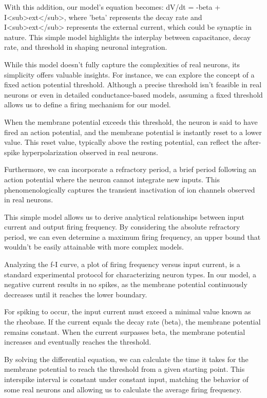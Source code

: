 With this addition, our model's equation becomes: dV/dt = -beta + I<sub>ext</sub>, where 'beta' represents the decay rate and I<sub>ext</sub> represents the external current, which could be synaptic in nature. This simple model highlights the interplay between capacitance, decay rate, and threshold in shaping neuronal integration.

While this model doesn't fully capture the complexities of real neurons, its simplicity offers valuable insights. For instance, we can explore the concept of a fixed action potential threshold. Although a precise threshold isn't feasible in real neurons or even in detailed conductance-based models, assuming a fixed threshold allows us to define a firing mechanism for our model.

When the membrane potential exceeds this threshold, the neuron is said to have fired an action potential, and the membrane potential is instantly reset to a lower value. This reset value, typically above the resting potential, can reflect the after-spike hyperpolarization observed in real neurons.

Furthermore, we can incorporate a refractory period, a brief period following an action potential where the neuron cannot integrate new inputs. This phenomenologically captures the transient inactivation of ion channels observed in real neurons.

This simple model allows us to derive analytical relationships between input current and output firing frequency. By considering the absolute refractory period, we can even determine a maximum firing frequency, an upper bound that wouldn't be easily attainable with more complex models.

Analyzing the f-I curve, a plot of firing frequency versus input current, is a standard experimental protocol for characterizing neuron types. In our model, a negative current results in no spikes, as the membrane potential continuously decreases until it reaches the lower boundary.

For spiking to occur, the input current must exceed a minimal value known as the rheobase. If the current equals the decay rate (beta), the membrane potential remains constant. When the current surpasses beta, the membrane potential increases and eventually reaches the threshold.

By solving the differential equation, we can calculate the time it takes for the membrane potential to reach the threshold from a given starting point. This interspike interval is constant under constant input, matching the behavior of some real neurons and allowing us to calculate the average firing frequency.

